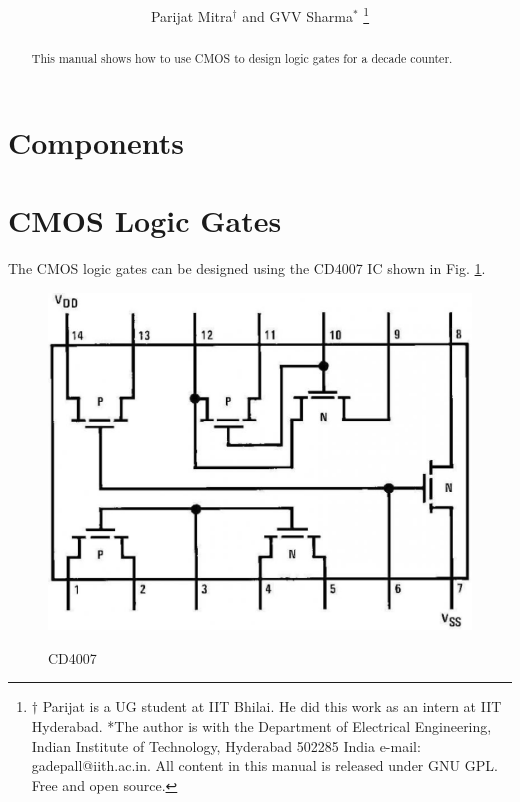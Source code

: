 \documentclass[journal,12pt,twocolumn]{IEEEtran}
\begin{document}
\theoremstyle{definition}
\newtheorem{theorem}{Theorem}[section]
\newtheorem{problem}{Problem}
\newcommand{\solution}{\noindent \textbf{Solution: }}
\title{
}
\author{Parijat Mitra$^{\dagger}$ and GVV Sharma$^{*}$
\thanks{$\dagger$ Parijat is a UG student at IIT Bhilai. He did this work as an intern at IIT Hyderabad. *The author is with the Department
of Electrical Engineering, Indian Institute of Technology, Hyderabad
502285 India e-mail:  gadepall@iith.ac.in. All content in this manual is released under GNU GPL.  Free and open source.}
}
\maketitle
\begin{abstract}
This manual shows how to use CMOS to design logic gates for a decade counter.
\end{abstract}

\section{Components}
\begin{table}[!h]
\centering

\caption{}
\label{table:components}
\end{table}

\section{CMOS Logic Gates}
The CMOS logic gates can be designed using the CD4007 IC shown in Fig. \ref{fig:exm}.
\begin{figure}[!h]
 \centering 
 {\includegraphics[width=\columnwidth]{./figs/CD4007.eps}} 
 \caption{CD4007}
 \label{fig:exm} 
\end{figure}
\end{document}
